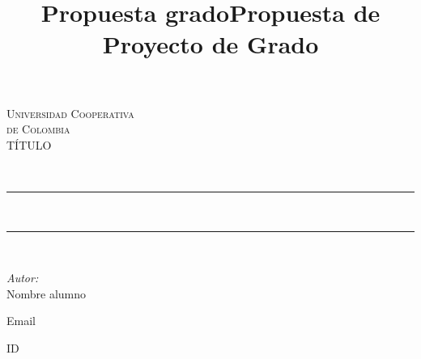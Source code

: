 \documentclass[10pt]{article}
\title{Propuesta grado}
\title{Propuesta de Proyecto de Grado}
\begin{document}
\begin{center}																		%
\newcommand{\HRule}{\rule{\linewidth}{0.5mm}}									%
\begin{minipage}{0.48\textwidth} \begin{flushleft}

\end{flushleft}\end{minipage}
\begin{minipage}{0.48\textwidth} \begin{flushright}

\end{flushright}\end{minipage}

\vspace*{-1.5cm}								%
\textsc{\huge Universidad Cooperativa\\ \vspace{5px} de Colombia}\\[1.5cm]	
%

TÍTULO

\textsc{\LARGE }\\													%

 			\vspace*{1cm}																		%
\HRule \\[0.4cm]																	%


\HRule \\[1.5cm]																	%
\begin{minipage}{0.46\textwidth}													%
\begin{flushleft} \large															%
\emph{Autor:}\\ 

Nombre alumno 

Email

ID
 \\






\end{flushleft}
\end{minipage}
\end{center}
\end{document}
